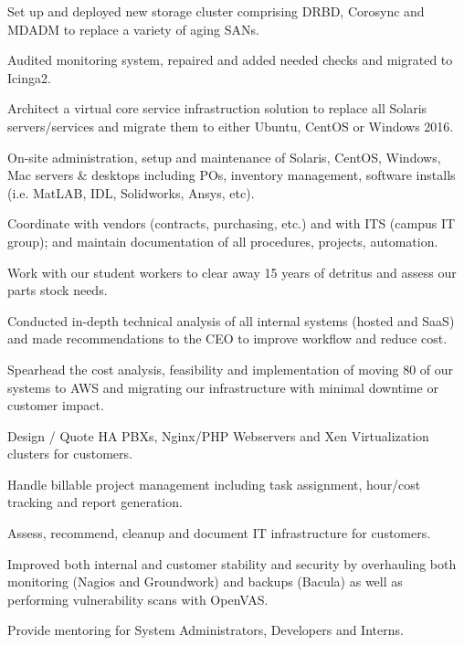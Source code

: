 \documentclass[letterpaper]{deedy-resume} %
\begin{document}
\begin{minipage}[t]{0.66\textwidth}
\begin{tightitemize}
\item Set up and deployed new storage cluster comprising DRBD, Corosync and MDADM to replace a variety of aging SANs.
\item Audited monitoring system, repaired and added needed checks and migrated to Icinga2.
\item Architect a virtual core service infrastruction solution to replace all Solaris servers/services and migrate them to either Ubuntu, CentOS or Windows 2016.
\item On-site administration, setup and maintenance of Solaris, CentOS, Windows, Mac servers \& desktops including POs, inventory management, software installs (i.e. MatLAB, IDL, Solidworks, Ansys, etc).
\item Coordinate with vendors (contracts, purchasing, etc.) and with ITS (campus IT group); and maintain documentation of all procedures, projects, automation.
\item Work with our student workers to clear away 15 years of detritus and assess our parts stock needs.
\end{tightitemize}




\begin{tightitemize}
\item Conducted in-depth technical analysis of all internal systems (hosted and SaaS) and made recommendations to the CEO to improve workflow and reduce cost.
\item Spearhead the cost analysis, feasibility and implementation of moving 80 of our systems to AWS and migrating our infrastructure with minimal downtime or customer impact.
\item Design / Quote HA PBXs, Nginx/PHP Webservers and Xen Virtualization clusters for customers.
\item Handle billable project management including task assignment, hour/cost tracking and report generation.
\item Assess, recommend, cleanup and document IT infrastructure for customers.
\item Improved both internal and customer stability and security by overhauling both monitoring (Nagios and Groundwork) and backups (Bacula) as well as performing vulnerability scans with OpenVAS.
\item Provide mentoring for System Administrators, Developers and Interns.
\end{tightitemize}


\end{minipage} %
\end{document}

